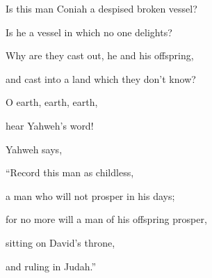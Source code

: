 {\par }{\Q {}Is this man Coniah a despised broken vessel?
\par }{\QB Is he a vessel in which no one delights?
\par }{\Q Why are they cast out, he and his offspring,
\par }{\QB and cast into a land which they don’t know?
\par }{\Q {}O earth, earth, earth,
\par }{\QB hear Yahweh’s word!
\par }{\Q {}Yahweh says,
\par }{\QB “Record this man as childless,
\par }{\QB a man who will not prosper in his days;
\par }{\Q for no more will a man of his offspring prosper,
\par }{\QB sitting on David’s throne,
\par }{\QB and ruling in Judah.”

}
